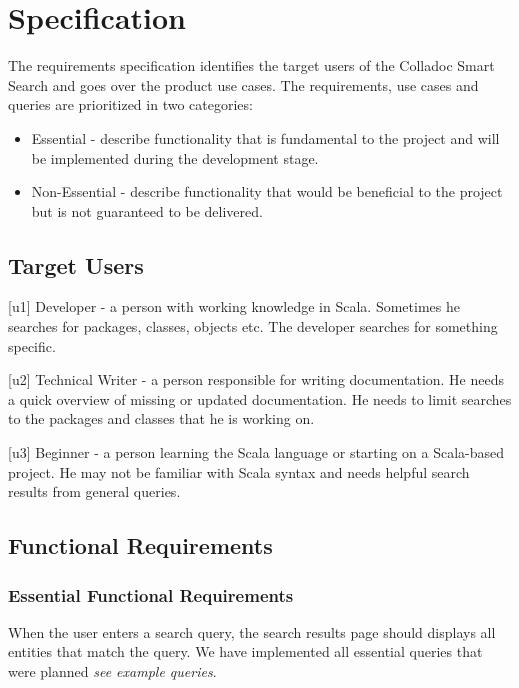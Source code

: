 \section{Specification}\label{sec:spec}

The requirements specification identifies the target users of the Colladoc Smart Search and goes over the product use cases. The requirements, use cases and queries are prioritized in two categories:

\begin{itemize}
\item  Essential - describe functionality that is fundamental to the project and will be implemented during  the development stage.

\item  Non-Essential - describe functionality that would be beneficial to the project but is not guaranteed to be delivered.
\end{itemize}

\subsection{Target Users}

[u1] Developer - a person with working knowledge in Scala. Sometimes he searches for packages, classes, objects etc. The developer searches for something specific.

[u2] Technical Writer - a person responsible for writing documentation. He needs a quick 
overview of missing or updated documentation. He needs to limit searches to the packages and classes that he is working on.

[u3] Beginner - a person learning the Scala language or starting on a Scala-based project. He may not be familiar with Scala syntax and needs helpful search results from general queries.

\subsection{Functional Requirements}

\subsubsection{Essential Functional Requirements}
\indent [c1] When the user enters a search query, the search results page should displays all entities that match the query. 
We have implemented all essential queries that were planned \emph{\color{red}see example queries}.

